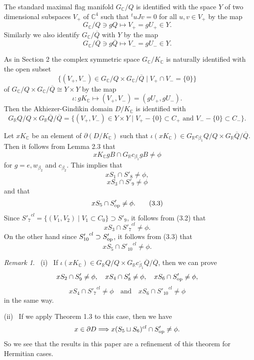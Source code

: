\documentclass[12pt,a4paper]{amsart}
\theoremstyle{definition}
\theoremstyle{remark}
\newtheorem{remark}[theorem]{Remark}
\numberwithin{equation}{section}
\def\br{\mathbb R}
\def\bc{\mathbb C}
\def\mand{\quad\mbox{and}\quad}
\def\p{\partial}
\def\op{{\rm op}}
\begin{document}
The standard maximal flag manifold $G_\bc/Q$ is identified with the space $Y$ of two dimensional subspaces $V_+$ of $\bc^4$ such that ${}^tuJv=0$ for all $u,v\in V_+$ by the map
$$G_\bc/Q\ni gQ\mapsto V_+=gU_+\in Y.$$
Similarly we also identify $G_\bc/\overline{Q}$ with $Y$ by the map
$$G_\bc/\overline{Q}\ni g\overline{Q}\mapsto V_-=gU_-\in Y.$$

As in Section 2 the complex symmetric space $G_\bc/K_\bc$ is naturally identified with the open subset
$$\{(V_+,V_-)\in G_\bc/Q\times G_\bc/\overline{Q} \mid V_+\cap V_-=\{0\}\}$$
of $G_\bc/Q\times G_\bc/\overline{Q}\cong Y\times Y$ by the map
$$\iota: gK_\bc\mapsto (V_+,V_-)=(gU_+,gU_-).$$
Then the Akhiezer-Gindikin domain $D/K_\bc$ is identified with
$$G_\br Q/Q\times G_\br \overline{Q} /\overline{Q}=\{(V_+,V_-)\in Y\times Y\mid V_+-\{0\}\subset C_+\mbox{ and }V_--\{0\}\subset C_-\}.$$

Let $xK_\bc$ be an element of $\p (D/K_\bc)$ such that $\iota(xK_\bc)\in G_\br c_{\beta_1}Q/Q\times G_\br \overline{Q} /\overline{Q}$. Then it follows from Lemma 2.3 that
$$xK_\bc gB\cap G_\br c_{\beta_1}gB\ne\phi$$
for $g=e,w_{\beta_2}$ and $c_{\beta_2}$. This implies that
\begin{equation}
xS_1\cap S'_8\ne\phi, \tag{3.1}
\end{equation}
\begin{equation}
xS_3\cap S'_9\ne\phi \tag{3.2}
\end{equation}
and that
\begin{equation}
xS_5\cap S'_\op\ne\phi. \tag{3.3}
\end{equation}
Since ${S'_7}^{cl}=\{(V_1,V_2)\mid V_1\subset C_0\}\supset S'_9$, it follows from (3.2) that
\begin{equation}
xS_3\cap {S'_7}^{cl}\ne\phi. \tag{3.4}
\end{equation}
On the other hand since ${S'_{10}}^{cl}\supset S'_\op$, it follows from (3.3) that
\begin{equation}
xS_5\cap {S'_{10}}^{cl}\ne\phi. \tag{3.5}
\end{equation}

\begin{remark} \ {\rm (i)} \ If $\iota(xK_\bc)\in G_\br Q/Q\times G_\br \overline{c_{\beta_1}}\overline{Q}/\overline{Q}$, then we can prove
$$xS_2\cap S'_9\ne\phi,\quad xS_4\cap S'_8\ne\phi,\quad xS_6\cap S'_\op\ne\phi,$$
$$xS_4\cap {S'_7}^{cl}\ne\phi\mand xS_6\cap {S'_{10}}^{cl}\ne\phi$$
in the same way.

{\rm(ii)} \ If we apply \cite{M8} Theorem 1.3 to this case, then we have
$$x\in\p D\Longrightarrow x(S_5\sqcup S_6)^{cl}\cap S'_\op\ne\phi.$$
So we see that the results in this paper are a refinement of this theorem for Hermitian cases.
\end{remark}
\end{document}
